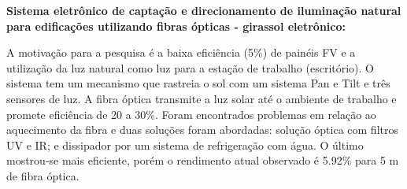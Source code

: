 
\textbf{Sistema eletrônico de captação e direcionamento de iluminação natural
para edificações utilizando fibras ópticas - girassol eletrônico:}

A motivação para a pesquisa é a baixa eficiência (5\%) de painéis FV e a
utilização da luz natural como luz para a estação de trabalho (escritório). O
sistema tem um mecanismo que rastreia o sol com um sistema Pan e Tilt e três
sensores de luz. A fibra óptica transmite a luz solar até o ambiente de trabalho
e promete eficiência de 20 a 30\%. Foram encontrados problemas em relação ao
aquecimento da fibra e duas soluções foram abordadas: solução óptica com filtros
UV e IR; e dissipador por um sistema de refrigeração com água. O último
mostrou-se mais eficiente, porém o rendimento atual observado é 5.92\% para 5 m
de fibra óptica.
